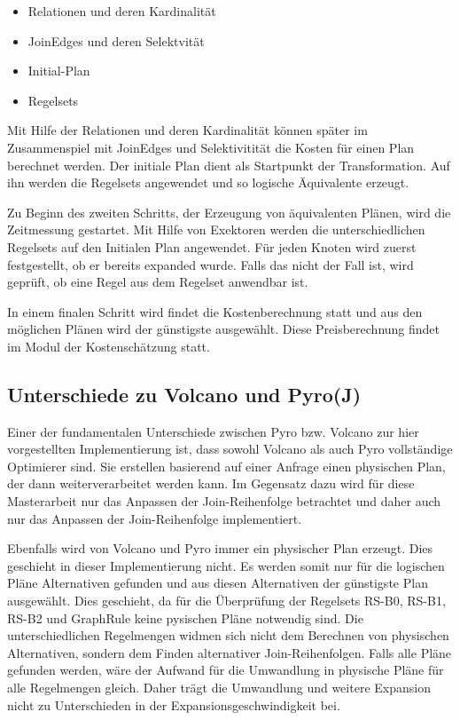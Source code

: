 \begin{itemize}
\item Relationen und deren Kardinalität 
\item JoinEdges und deren Selektvität
\item Initial-Plan
\item Regelsets
\end{itemize}

Mit Hilfe der Relationen und deren Kardinalität können später im Zusammenspiel mit JoinEdges und Selektivitität die Kosten für einen Plan berechnet werden. Der initiale Plan dient als Startpunkt der Transformation. Auf ihn werden die Regelsets angewendet und so logische  Äquivalente erzeugt.

Zu Beginn des zweiten Schritts, der Erzeugung von äquivalenten Plänen, wird die Zeitmessung gestartet.  Mit Hilfe von Exektoren werden die unterschiedlichen Regelsets auf den Initialen Plan angewendet. Für jeden Knoten wird zuerst festgestellt, ob er bereits expanded wurde. Falls das nicht der Fall ist, wird geprüft, ob eine Regel aus dem Regelset anwendbar ist. 

In einem finalen Schritt wird findet die Kostenberechnung statt und aus den möglichen Plänen wird der günstigste ausgewählt. Diese Preisberechnung findet im Modul der Kostenschätzung statt.


\subsection{Unterschiede zu Volcano und Pyro(J)}

Einer der fundamentalen Unterschiede zwischen Pyro bzw. Volcano zur hier vorgestellten Implementierung ist, dass sowohl Volcano als auch Pyro vollständige Optimierer sind. Sie erstellen basierend auf einer Anfrage einen physischen Plan, der dann weiterverarbeitet werden kann. Im Gegensatz dazu wird für diese Masterarbeit nur das Anpassen der Join-Reihenfolge betrachtet und daher auch nur das Anpassen der Join-Reihenfolge implementiert.


Ebenfalls wird von Volcano und Pyro immer ein physischer Plan erzeugt. Dies geschieht in dieser Implementierung nicht. Es werden somit nur für die logischen Pläne Alternativen gefunden und aus diesen Alternativen der günstigste Plan ausgewählt. Dies geschieht, da für die Überprüfung der Regelsets RS-B0, RS-B1, RS-B2 und GraphRule keine pysischen Pläne notwendig sind. Die unterschiedlichen Regelmengen widmen sich nicht dem Berechnen von physischen Alternativen, sondern dem Finden alternativer Join-Reihenfolgen. Falls alle Pläne gefunden werden, wäre der Aufwand für die Umwandlung in physische Pläne für alle Regelmengen gleich. Daher trägt die Umwandlung und weitere Expansion nicht zu Unterschieden in der Expansionsgeschwindigkeit bei.

